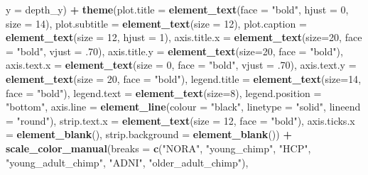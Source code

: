 \documentclass[
]{article}
\newenvironment{Shaded}{\begin{snugshade}}{\end{snugshade}}
\newcommand{\DataTypeTok}[1]{\textcolor[rgb]{0.13,0.29,0.53}{#1}}
\newcommand{\DecValTok}[1]{\textcolor[rgb]{0.00,0.00,0.81}{#1}}
\newcommand{\FloatTok}[1]{\textcolor[rgb]{0.00,0.00,0.81}{#1}}
\newcommand{\KeywordTok}[1]{\textcolor[rgb]{0.13,0.29,0.53}{\textbf{#1}}}
\newcommand{\NormalTok}[1]{#1}
\newcommand{\OperatorTok}[1]{\textcolor[rgb]{0.81,0.36,0.00}{\textbf{#1}}}
\newcommand{\StringTok}[1]{\textcolor[rgb]{0.31,0.60,0.02}{#1}}
\begin{document}
\begin{Shaded}
\begin{Highlighting}[]
       \DataTypeTok{y =}\NormalTok{ depth_y) }\OperatorTok{+}\StringTok{ }
\StringTok{  }\KeywordTok{theme}\NormalTok{(}\DataTypeTok{plot.title =} \KeywordTok{element_text}\NormalTok{(}\DataTypeTok{face =} \StringTok{"bold"}\NormalTok{, }\DataTypeTok{hjust =} \DecValTok{0}\NormalTok{, }\DataTypeTok{size =} \DecValTok{14}\NormalTok{), }
        \DataTypeTok{plot.subtitle =} \KeywordTok{element_text}\NormalTok{(}\DataTypeTok{size =} \DecValTok{12}\NormalTok{),}
        \DataTypeTok{plot.caption =} \KeywordTok{element_text}\NormalTok{(}\DataTypeTok{size =} \DecValTok{12}\NormalTok{, }\DataTypeTok{hjust =} \DecValTok{1}\NormalTok{),}
        \DataTypeTok{axis.title.x =} \KeywordTok{element_text}\NormalTok{(}\DataTypeTok{size=}\DecValTok{20}\NormalTok{, }\DataTypeTok{face =} \StringTok{"bold"}\NormalTok{, }\DataTypeTok{vjust =} \FloatTok{.70}\NormalTok{),}
        \DataTypeTok{axis.title.y =} \KeywordTok{element_text}\NormalTok{(}\DataTypeTok{size=}\DecValTok{20}\NormalTok{, }\DataTypeTok{face =} \StringTok{"bold"}\NormalTok{),}
        \DataTypeTok{axis.text.x =} \KeywordTok{element_text}\NormalTok{(}\DataTypeTok{size =} \DecValTok{0}\NormalTok{, }\DataTypeTok{face =} \StringTok{"bold"}\NormalTok{, }\DataTypeTok{vjust =} \FloatTok{.70}\NormalTok{),}
        \DataTypeTok{axis.text.y =} \KeywordTok{element_text}\NormalTok{(}\DataTypeTok{size =} \DecValTok{20}\NormalTok{, }\DataTypeTok{face =} \StringTok{"bold"}\NormalTok{),}
        \DataTypeTok{legend.title =} \KeywordTok{element_text}\NormalTok{(}\DataTypeTok{size=}\DecValTok{14}\NormalTok{, }\DataTypeTok{face =} \StringTok{"bold"}\NormalTok{), }
        \DataTypeTok{legend.text =} \KeywordTok{element_text}\NormalTok{(}\DataTypeTok{size=}\DecValTok{8}\NormalTok{),}
        \DataTypeTok{legend.position =} \StringTok{"bottom"}\NormalTok{,}
        \DataTypeTok{axis.line =} \KeywordTok{element_line}\NormalTok{(}\DataTypeTok{colour =} \StringTok{"black"}\NormalTok{, }\DataTypeTok{linetype =} \StringTok{"solid"}\NormalTok{, }\DataTypeTok{lineend =} \StringTok{"round"}\NormalTok{),}
        \DataTypeTok{strip.text.x =} \KeywordTok{element_text}\NormalTok{(}\DataTypeTok{size =} \DecValTok{12}\NormalTok{, }\DataTypeTok{face =} \StringTok{"bold"}\NormalTok{),}
        \DataTypeTok{axis.ticks.x =} \KeywordTok{element_blank}\NormalTok{(), }
        \DataTypeTok{strip.background =} \KeywordTok{element_blank}\NormalTok{()) }\OperatorTok{+}\StringTok{ }
\StringTok{  }\KeywordTok{scale_color_manual}\NormalTok{(}\DataTypeTok{breaks =} 
                       \KeywordTok{c}\NormalTok{(}\StringTok{"NORA"}\NormalTok{, }\StringTok{"young_chimp"}\NormalTok{, }\StringTok{"HCP"}\NormalTok{, }\StringTok{"young_adult_chimp"}\NormalTok{, }\StringTok{"ADNI"}\NormalTok{, }\StringTok{"older_adult_chimp"}\NormalTok{),}

\end{Highlighting}
\end{Shaded}
\end{document}
